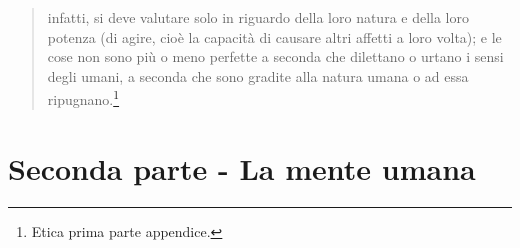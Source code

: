 \begin{quotation}
	infatti, si deve valutare solo in riguardo della loro natura e della loro potenza (di agire, cioè la capacità  di causare altri affetti a loro volta); e le cose non
	sono più o meno perfette a seconda che dilettano o urtano i sensi degli umani, a seconda
	che sono gradite alla natura umana o ad essa ripugnano.\footnote{Etica prima parte appendice.}
	
\end{quotation}
\newpage
\section{Seconda parte - La mente umana}